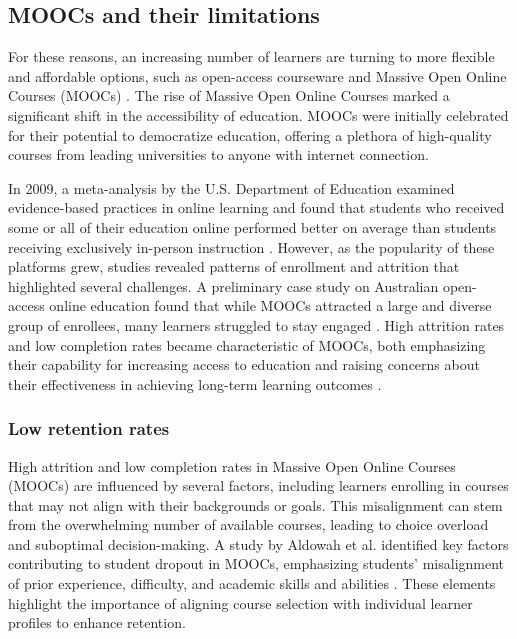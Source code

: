 \subsection{MOOCs and their limitations}
For these reasons, an increasing number of learners are turning to more flexible and affordable options, such as open-access courseware and Massive Open Online Courses (MOOCs) \cite{harish_online_2013} \cite{pampouri_massive_2021}. The rise of Massive Open Online Courses marked a significant shift in the accessibility of education. MOOCs were initially celebrated for their potential to democratize education, offering a plethora of high-quality courses from leading universities to anyone with internet connection. 

In 2009, a meta-analysis by the U.S. Department of Education examined evidence-based practices in online learning and found that students who received some or all of their education online performed better on average than students receiving exclusively in-person instruction \cite{means_evaluation_2009}. However, as the popularity of these platforms grew, studies revealed patterns of enrollment and attrition that highlighted several challenges. A preliminary case study on Australian open-access online education found that while MOOCs attracted a large and diverse group of enrollees, many learners struggled to stay engaged \cite{greenland_patterns_2014}. High attrition rates and low completion rates became characteristic of MOOCs, both emphasizing their capability for increasing access to education and raising concerns about their effectiveness in achieving long-term learning outcomes \cite{clow_moocs_2013}. 

\subsubsection{Low retention rates}

High attrition and low completion rates in Massive Open Online Courses (MOOCs) are influenced by several factors, including learners enrolling in courses that may not align with their backgrounds or goals. This misalignment can stem from the overwhelming number of available courses, leading to choice overload and suboptimal decision-making. A study by Aldowah et al. identified key factors contributing to student dropout in MOOCs, emphasizing students’ misalignment of prior experience, difficulty, and academic skills and abilities \cite{noauthor_factors_nodate}. These elements highlight the importance of aligning course selection with individual learner profiles to enhance retention. 

